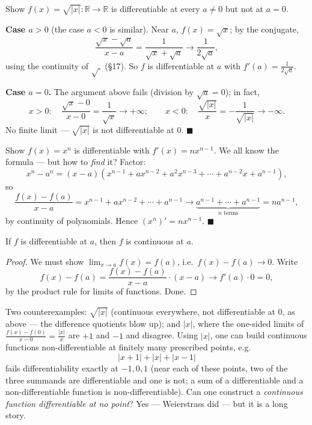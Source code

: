 \documentclass[11pt]{report}
\begin{document}
\begin{exbox}
Show $f(x) = \sqrt{|x|}: \mathbb{R} \to \mathbb{R}$ is differentiable at every $a \neq 0$ but not at $a = 0$.

\textbf{Case $a > 0$} (the case $a < 0$ is similar). Near $a$, $f(x) = \sqrt x$; by the conjugate,
\[
\frac{\sqrt x - \sqrt a}{x - a} = \frac{1}{\sqrt x + \sqrt a} \longrightarrow \frac{1}{2\sqrt a},
\]
using the continuity of $\sqrt{\ }$ (\S 17). So $f$ is differentiable at $a$ with $f'(a) = \tfrac{1}{2\sqrt a}$.

\textbf{Case $a = 0$.} The argument above fails (division by $\sqrt a = 0$); in fact,
\[
x > 0: \quad \frac{\sqrt x - 0}{x - 0} = \frac{1}{\sqrt x} \longrightarrow +\infty; \qquad
x < 0: \quad \frac{\sqrt{|x|}}{x} = -\frac{1}{\sqrt{|x|}} \longrightarrow -\infty.
\]
No finite limit --- $\sqrt{|x|}$ is not differentiable at $0$. \hfill $\blacksquare$
\end{exbox}

\begin{exbox}
Show $f(x) = x^n$ is differentiable with $f'(x) = n x^{n-1}$. We all know the formula --- but how to \emph{find} it? Factor:
\[
x^n - a^n = (x - a)\left( x^{n-1} + a x^{n-2} + a^2 x^{n-3} + \cdots + a^{n-2} x + a^{n-1} \right),
\]
so
\[
\frac{f(x) - f(a)}{x - a} = x^{n-1} + a x^{n-2} + \cdots + a^{n-1} \longrightarrow \underbrace{a^{n-1} + \cdots + a^{n-1}}_{n \text{ terms}} = n a^{n-1},
\]
by continuity of polynomials. Hence $(x^n)' = n x^{n-1}$. \hfill $\blacksquare$
\end{exbox}

\begin{thmbox}
If $f$ is differentiable at $a$, then $f$ is continuous at $a$.
\end{thmbox}

\begin{proof}
We must show $\lim_{x\to a} f(x) = f(a)$, i.e.\ $f(x) - f(a) \to 0$. Write
\[
f(x) - f(a) = \frac{f(x) - f(a)}{x - a} \cdot (x - a) \longrightarrow f'(a) \cdot 0 = 0,
\]
by the product rule for limits of functions. Done.
\end{proof}

\begin{rembox}
Two counterexamples: $\sqrt{|x|}$ (continuous everywhere, not differentiable at $0$, as above --- the difference quotients blow up); and $|x|$, where the one-sided limits of $\tfrac{f(x) - f(0)}{x - 0} = \tfrac{|x|}{x}$ are $+1$ and $-1$ and disagree. Using $|x|$, one can build continuous functions non-differentiable at finitely many prescribed points, e.g.
\[
|x+1| + |x| + |x-1|
\]
fails differentiability exactly at $-1, 0, 1$ (near each of these points, two of the three summands are differentiable and one is not; a sum of a differentiable and a non-differentiable function is non-differentiable). Can one construct a \emph{continuous function differentiable at no point}? Yes --- Weierstrass did --- but it is a long story.
\end{rembox}
\end{document}
